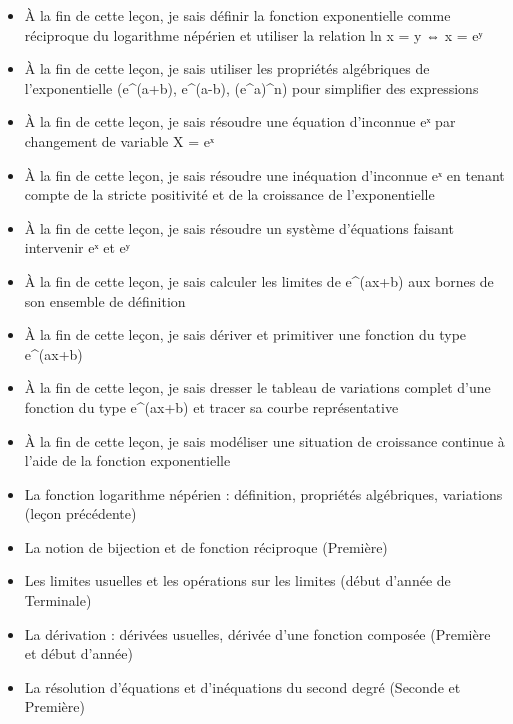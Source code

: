 \documentclass[11pt]{article}
\begin{document}
\begin{objectifs}
\begin{itemize}
\item À la fin de cette leçon, je sais définir la fonction exponentielle comme réciproque du logarithme népérien et utiliser la relation ln x = y ⇔ x = eʸ
\item À la fin de cette leçon, je sais utiliser les propriétés algébriques de l'exponentielle (e\^{}(a+b), e\^{}(a-b), (e\^{}a)\^{}n) pour simplifier des expressions
\item À la fin de cette leçon, je sais résoudre une équation d'inconnue eˣ par changement de variable X = eˣ
\item À la fin de cette leçon, je sais résoudre une inéquation d'inconnue eˣ en tenant compte de la stricte positivité et de la croissance de l'exponentielle
\item À la fin de cette leçon, je sais résoudre un système d'équations faisant intervenir eˣ et eʸ
\item À la fin de cette leçon, je sais calculer les limites de e\^{}(ax+b) aux bornes de son ensemble de définition
\item À la fin de cette leçon, je sais dériver et primitiver une fonction du type e\^{}(ax+b)
\item À la fin de cette leçon, je sais dresser le tableau de variations complet d'une fonction du type e\^{}(ax+b) et tracer sa courbe représentative
\item À la fin de cette leçon, je sais modéliser une situation de croissance continue à l'aide de la fonction exponentielle
\end{itemize}
\end{objectifs}

\begin{prerequis}
\begin{itemize}
\item La fonction logarithme népérien : définition, propriétés algébriques, variations (leçon précédente)
\item La notion de bijection et de fonction réciproque (Première)
\item Les limites usuelles et les opérations sur les limites (début d'année de Terminale)
\item La dérivation : dérivées usuelles, dérivée d'une fonction composée (Première et début d'année)
\item La résolution d'équations et d'inéquations du second degré (Seconde et Première)
\end{itemize}
\end{prerequis}
\end{document}
